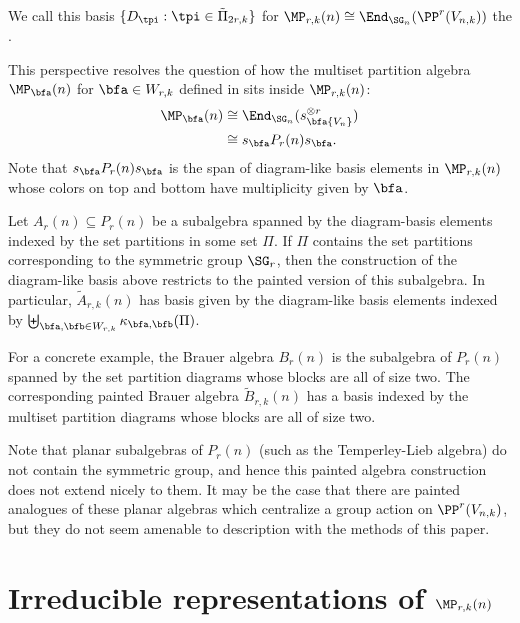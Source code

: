We call this basis $\{D_\tpi:\tpi\in\tilde{\Pi}_{2r,k}\}$ for $\MP_{r,k}(n)\cong\End_{\SG_n}(\PP^r(V_{n,k}))$ the .

\begin{rema} This perspective resolves the question of how the multiset partition algebra $\MP_\bfa(n)$ for $\bfa\in W_{r,k}$ defined in \cite{narayanan} sits inside $\MP_{r,k}(n)$:\begin{align*}
    \MP_{\bfa}(n)&\cong\End_{\SG_n}(s_\bfa {V_n}^{\otimes r})\\
    &\cong s_\bfa P_r(n) s_\bfa.
\end{align*} Note that $s_\bfa P_r(n) s_\bfa$ is the span of diagram-like basis elements in $\MP_{r,k}(n)$ whose colors on top and bottom have multiplicity given by $\bfa$.
\end{rema}

\begin{rema}\label{rem:other_subalgebras}
    Let $A_r(n)\subseteq P_r(n)$ be a subalgebra spanned by the diagram-basis elements indexed by the set partitions in some set $\Pi$. If $\Pi$ contains the set partitions corresponding to the symmetric group $\SG_r$, then the construction of the diagram-like basis above restricts to the painted version of this subalgebra. In particular, $\tilde{A}_{r,k}(n)$ has basis given by the diagram-like basis elements indexed by $\biguplus_{\bfa,\bfb\in W_{r,k}}\kappa_{\bfa,\bfb}(\Pi)$.

    For a concrete example, the Brauer algebra $B_r(n)$ is the subalgebra of $P_r(n)$ spanned by the set partition diagrams whose blocks are all of size two. The corresponding painted Brauer algebra $\tilde{B}_{r,k}(n)$ has a basis indexed by the multiset partition diagrams whose blocks are all of size two.

    Note that planar subalgebras of $P_r(n)$ (such as the Temperley-Lieb algebra) do not contain the symmetric group, and hence this painted algebra construction does not extend nicely to them. It may be the case that there are painted analogues of these planar algebras which centralize a group action on $\PP^r(V_{n,k})$, but they do not seem amenable to description with the methods of this paper.
\end{rema}

\section{Irreducible representations of \texorpdfstring{$\MP_{r,k}(n)$}{MP\_r,k(n)}}\label{sec:reps}

